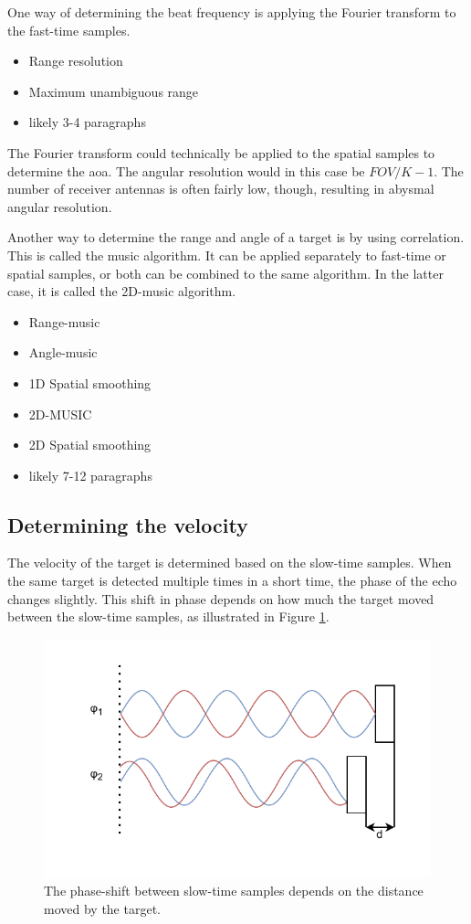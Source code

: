 One way of determining the beat frequency
is applying the Fourier transform to the fast-time samples.
\begin{itemize}
    \item Range resolution
    \item Maximum unambiguous range
    \item likely 3-4 paragraphs
\end{itemize}

The Fourier transform could technically be applied to the spatial samples
to determine the \gls{aoa}.
The angular resolution would in this case be $FOV / K-1$.
The number of receiver antennas is often fairly low, though,
resulting in abysmal angular resolution.

Another way to determine the range and angle of a target is by using correlation.
This is called the \gls{music} algorithm.
It can be applied separately to fast-time or spatial samples,
or both can be combined to the same algorithm.
In the latter case, it is called the 2D-\gls{music} algorithm.

\begin{itemize}
    \item Range-music
    \item Angle-music
    \item 1D Spatial smoothing
    \item 2D-MUSIC
    \item 2D Spatial smoothing
    \item likely 7-12 paragraphs
\end{itemize}

\subsection{Determining the velocity}
\label{sec:velocity}
The velocity of the target is determined based on the slow-time samples.
When the same target is detected multiple times in a short time,
the phase of the echo changes slightly.
This shift in phase depends on how much the target moved between the slow-time samples,
as illustrated in Figure \ref{fig:fmcw_slow_time_principle}.
\begin{figure}
    \centering
    \includegraphics[width=.9\textwidth]{fig/2/fmcw_slow_time_principle.pdf}
    \caption{The phase-shift between slow-time samples depends on the distance moved by the target.}
    \label{fig:fmcw_slow_time_principle}
\end{figure}

